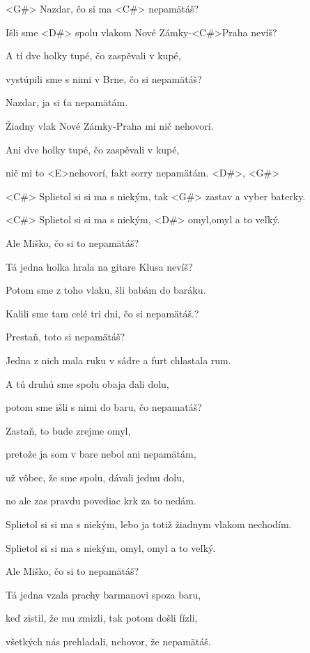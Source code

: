 

\zs
<G#> Nazdar, čo si ma <C#> nepamätáš? 

Išli sme <D#> spolu vlakom Nové Zámky-<C#>Praha nevíš? 

A tí dve holky tupé, čo zaspěvali v kupé, 

vystúpili sme s nimi v Brne, čo si nepamätáš? 
\ks

\zs
Nazdar, ja si ťa nepamätám. 

Žiadny vlak Nové Zámky-Praha mi nič nehovorí. 

Ani dve holky tupé, čo zaspěvali v kupé, 

nič mi to <E>nehovorí, fakt sorry nepamätám. <D#>, <G#> 
\ks

\zr
<C#> Splietol si si ma s niekým, tak <G#> zastav a vyber baterky. 

<C#> Splietol si si ma s niekým, <D#> omyl,omyl a to veľký. 
\kr

\zs
Ale Miško, čo si to nepamätáš? 

Tá jedna holka hrala na gitare Klusa nevíš? 

Potom sme z toho vlaku, šli babám do baráku. 

Kalili sme tam celé tri dni, čo si nepamätáš.? 
\ks

\zs
Prestaň, toto si nepamätáš? 

Jedna z nich mala ruku v sádre a furt chlastala rum. 

A tú druhú sme spolu obaja dali dolu, 

potom sme išli s nimi do baru, čo nepamatáš? 
\ks

\zs
Zastaň, to bude zrejme omyl, 

pretože ja som v bare nebol ani nepamätám, 

už vôbec, že sme spolu, dávali jednu dolu, 

no ale zas pravdu povediac krk za to nedám. 
\ks

\zr
Splietol si si ma s niekým, lebo ja totiž žiadnym vlakom nechodím. 

Splietol si si ma s niekým, omyl, omyl a to veľký. 
\kr

\zs
Ale Miško, čo si to nepamätáš? 

Tá jedna vzala prachy barmanovi spoza baru, 

keď zistil, že mu zmizli, tak potom došli fízli, 

všetkých nás prehladali, nehovor, že nepamätáš. 
\ks

